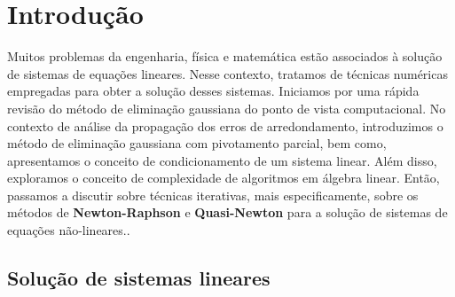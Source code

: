 \documentclass[
	12pt,				%
	oneside,			%
	a4paper,			%
	english,			%
	french,				%
	spanish,			%
	brazil				%
	]{abntex2}
\newcommand{\MATLAB}{MATLAB\textsuperscript{\textregistered}\xspace}
\begin{document}
\textual
\chapter{Introdução}
Muitos problemas da engenharia, física e matemática estão associados à solução de sistemas de equações lineares. Nesse contexto, tratamos de técnicas numéricas empregadas para obter a solução desses sistemas. Iniciamos por uma rápida revisão do método de eliminação gaussiana do ponto de vista computacional. No contexto de análise da propagação dos erros de arredondamento, introduzimos o método de eliminação gaussiana com pivotamento parcial, bem como, apresentamos o conceito de condicionamento de um sistema linear. Além disso, exploramos o conceito de complexidade de algoritmos em álgebra linear. Então, passamos a discutir sobre técnicas iterativas, mais especificamente, sobre os métodos de \textbf{Newton-Raphson} e \textbf{Quasi-Newton} para a solução de sistemas de equações não-lineares.\cite{neide}.

\section{Solução de sistemas lineares}
\end{document}
